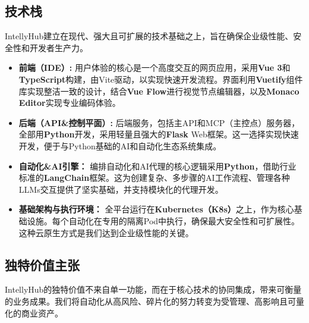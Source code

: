 \documentclass[11点, A4纸, 单面]{article}
\begin{document}
\pagebreak
\subsection{技术栈}
IntellyHub建立在现代、强大且可扩展的技术基础之上，旨在确保企业级性能、安全性和开发者生产力。

\begin{itemize}
\item \textbf{前端（IDE）:} 用户体验的核心是一个高度交互的网页应用，采用\textbf{Vue 3}和\textbf{TypeScript}构建，由Vite驱动，以实现快速开发流程。界面利用\textbf{Vuetify}组件库实现整洁一致的设计，结合\textbf{Vue Flow}进行视觉节点编辑器，以及\textbf{Monaco Editor}实现专业编码体验。
\item \textbf{后端（API\&控制平面）:} 后端服务，包括主API和MCP（主控点）服务器，全部用\textbf{Python}开发，采用轻量且强大的\textbf{Flask} Web框架。这一选择实现快速开发，便于与Python基础的AI和自动化生态系统集成。
\item \textbf{自动化\&AI引擎：} 编排自动化和AI代理的核心逻辑采用\textbf{Python}，借助行业标准的\textbf{LangChain}框架。这为创建复杂、多步骤的AI工作流程、管理各种LLMs交互提供了坚实基础，并支持模块化的代理开发。
\item \textbf{基础架构与执行环境：} 全平台运行在\textbf{Kubernetes（K8s）}之上，作为核心基础设施。每个自动化在专用的隔离Pod中执行，确保最大安全性和可扩展性。这种云原生方式是我们达到企业级性能的关键。
\end{itemize}

\subsection{独特价值主张}
IntellyHub的独特价值不来自单一功能，而在于核心技术的协同集成，带来可衡量的业务成果。我们将自动化从高风险、碎片化的努力转变为受管理、高影响且可量化的商业资产。
\end{document}
